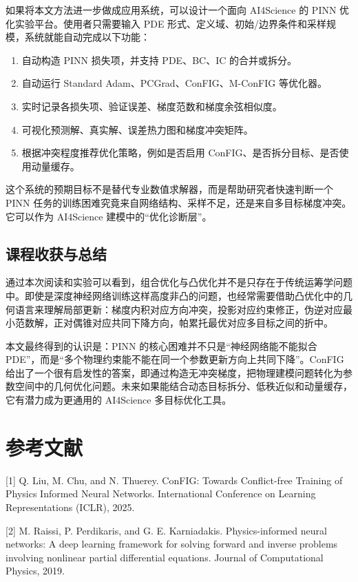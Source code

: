 \documentclass[UTF8,a4paper,12pt,fontset=none]{ctexart}
\begin{document}
如果将本文方法进一步做成应用系统，可以设计一个面向 AI4Science 的 PINN 优化实验平台。使用者只需要输入 PDE 形式、定义域、初始/边界条件和采样规模，系统就能自动完成以下功能：


\begin{enumerate}
\item 自动构造 PINN 损失项，并支持 PDE、BC、IC 的合并或拆分。
\item 自动运行 Standard Adam、PCGrad、ConFIG、M-ConFIG 等优化器。
\item 实时记录各损失项、验证误差、梯度范数和梯度余弦相似度。
\item 可视化预测解、真实解、误差热力图和梯度冲突矩阵。
\item 根据冲突程度推荐优化策略，例如是否启用 ConFIG、是否拆分目标、是否使用动量缓存。
\end{enumerate}

这个系统的预期目标不是替代专业数值求解器，而是帮助研究者快速判断一个 PINN 任务的训练困难究竟来自网络结构、采样不足，还是来自多目标梯度冲突。它可以作为 AI4Science 建模中的“优化诊断层”。


\subsection{课程收获与总结}

通过本次阅读和实验可以看到，组合优化与凸优化并不是只存在于传统运筹学问题中。即使是深度神经网络训练这样高度非凸的问题，也经常需要借助凸优化中的几何语言来理解局部更新：梯度内积对应方向冲突，投影对应约束修正，伪逆对应最小范数解，正对偶锥对应共同下降方向，帕累托最优对应多目标之间的折中。


本文最终得到的认识是：PINN 的核心困难并不只是“神经网络能不能拟合 PDE”，而是“多个物理约束能不能在同一个参数更新方向上共同下降”。ConFIG 给出了一个很有启发性的答案，即通过构造无冲突梯度，把物理建模问题转化为参数空间中的几何优化问题。未来如果能结合动态目标拆分、低秩近似和动量缓存，它有潜力成为更通用的 AI4Science 多目标优化工具。




\newpage
\section{参考文献}

[1] Q. Liu, M. Chu, and N. Thuerey. ConFIG: Towards Conflict-free Training of Physics Informed Neural Networks. International Conference on Learning Representations (ICLR), 2025.


[2] M. Raissi, P. Perdikaris, and G. E. Karniadakis. Physics-informed neural networks: A deep learning framework for solving forward and inverse problems involving nonlinear partial differential equations. Journal of Computational Physics, 2019.
\end{document}
